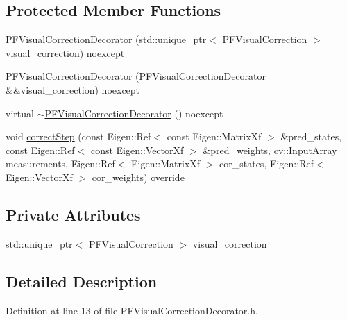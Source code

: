 \subsection*{Protected Member Functions}
\begin{DoxyCompactItemize}
\item 
\mbox{\hyperlink{classbfl_1_1PFVisualCorrectionDecorator_acb09d9ba0fddbf4d6b9d27b407310fcb}{P\+F\+Visual\+Correction\+Decorator}} (std\+::unique\+\_\+ptr$<$ \mbox{\hyperlink{classbfl_1_1PFVisualCorrection}{P\+F\+Visual\+Correction}} $>$ visual\+\_\+correction) noexcept
\item 
\mbox{\hyperlink{classbfl_1_1PFVisualCorrectionDecorator_a5e4e3bb52979194052614e1868c971af}{P\+F\+Visual\+Correction\+Decorator}} (\mbox{\hyperlink{classbfl_1_1PFVisualCorrectionDecorator}{P\+F\+Visual\+Correction\+Decorator}} \&\&visual\+\_\+correction) noexcept
\item 
virtual \mbox{\hyperlink{classbfl_1_1PFVisualCorrectionDecorator_ae534cfef158d8c24d02262d2c037a375}{$\sim$\+P\+F\+Visual\+Correction\+Decorator}} () noexcept
\item 
void \mbox{\hyperlink{classbfl_1_1PFVisualCorrectionDecorator_a0e02eb41e938fc083c18bff3ddf9b6d3}{correct\+Step}} (const Eigen\+::\+Ref$<$ const Eigen\+::\+Matrix\+Xf $>$ \&pred\+\_\+states, const Eigen\+::\+Ref$<$ const Eigen\+::\+Vector\+Xf $>$ \&pred\+\_\+weights, cv\+::\+Input\+Array measurements, Eigen\+::\+Ref$<$ Eigen\+::\+Matrix\+Xf $>$ cor\+\_\+states, Eigen\+::\+Ref$<$ Eigen\+::\+Vector\+Xf $>$ cor\+\_\+weights) override
\end{DoxyCompactItemize}
\subsection*{Private Attributes}
\begin{DoxyCompactItemize}
\item 
std\+::unique\+\_\+ptr$<$ \mbox{\hyperlink{classbfl_1_1PFVisualCorrection}{P\+F\+Visual\+Correction}} $>$ \mbox{\hyperlink{classbfl_1_1PFVisualCorrectionDecorator_ae8d8e4e54e4b78b51f69a6a469d269f6}{visual\+\_\+correction\+\_\+}}
\end{DoxyCompactItemize}


\subsection{Detailed Description}


Definition at line 13 of file P\+F\+Visual\+Correction\+Decorator.\+h.



